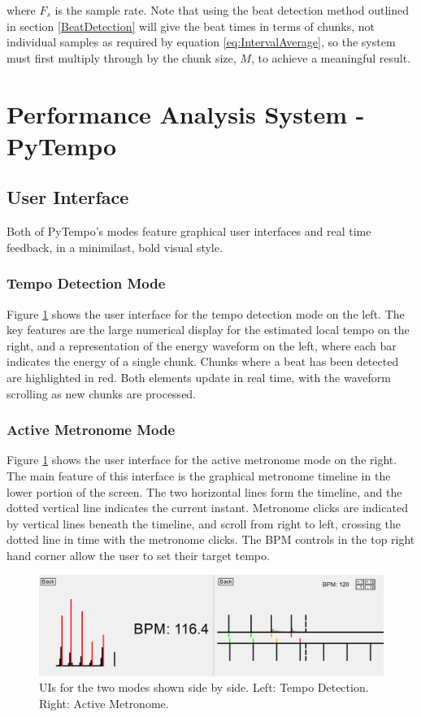 \documentclass[hidelinks,12pt]{article}
\begin{document}
where $F_s$ is the sample rate. Note that using the beat detection method outlined in section \ref{BeatDetection} will give the beat times in terms of chunks, not individual samples as required by equation \ref{eq:IntervalAverage}, so the system must first multiply through by the chunk size, $M$, to achieve a meaningful result.

\section{Performance Analysis System - PyTempo} \label{PyTempo}
\subsection{User Interface}
Both of PyTempo's modes feature graphical user interfaces and real time feedback, in a minimilast, bold visual style.

\subsubsection{Tempo Detection Mode}
Figure \ref{fig:UIScreenshot} shows the user interface for the tempo detection mode on the left. The key features are the large numerical display for the estimated local tempo on the right, and a representation of the energy waveform on the left, where each bar indicates the energy of a single chunk. Chunks where a beat has been detected are highlighted in red. Both elements update in real time, with the waveform scrolling as new chunks are processed.

\subsubsection{Active Metronome Mode}
Figure \ref{fig:UIScreenshot} shows the user interface for the active metronome mode on the right. The main feature of this interface is the graphical metronome timeline in the lower portion of the screen. The two horizontal lines form the timeline, and the dotted vertical line indicates the current instant. Metronome clicks are indicated by vertical lines beneath the timeline, and scroll from right to left, crossing the dotted line in time with the metronome clicks. The BPM controls in the top right hand corner allow the user to set their target tempo.

\begin{figure}[H]
	\begin{center}
		\includegraphics[scale=0.4]{UI.png}
		\caption{UIs for the two modes shown side by side. Left: Tempo Detection. Right: Active Metronome.}
		\label{fig:UIScreenshot}
	\end{center}
\end{figure}
\end{document}
